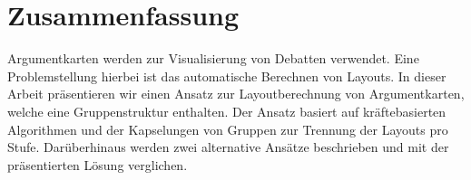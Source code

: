 \chapter*{Zusammenfassung}

Argumentkarten werden zur Visualisierung von Debatten verwendet. Eine Problemstellung hierbei ist das automatische Berechnen von Layouts.
In dieser Arbeit präsentieren wir einen Ansatz zur Layoutberechnung von Argumentkarten, welche eine Gruppenstruktur enthalten.
Der Ansatz basiert auf kräftebasierten Algorithmen und der Kapselungen von Gruppen zur Trennung der Layouts pro Stufe. Darüberhinaus werden zwei alternative Ansätze beschrieben
und mit der präsentierten Lösung verglichen.